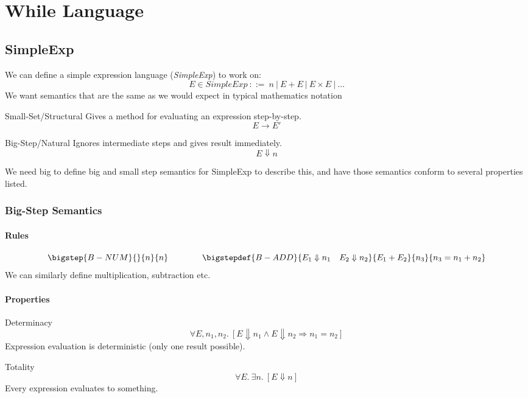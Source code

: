 \chapter{While Language}

\section{SimpleExp}
We can define a simple expression language (\textit{SimpleExp}) to work on:
\[E \in SimpleExp \ ::= \ n \ | \ E + E \ | \ E \times E \ | \ \dots\]
We want semantics that are the same as we would expect in typical mathematics notation
\begin{tcbraster}[raster columns=2,raster equal height]
    \begin{definitionbox}{Small-Set/Structural}
        Gives a method for evaluating an expression step-by-step.
        \[E \to E'\]
    \end{definitionbox}
    \begin{definitionbox}{Big-Step/Natural}
        Ignores intermediate steps and gives result immediately.
        \[E \Downarrow n\]
    \end{definitionbox}
\end{tcbraster}
\noindent We need big to define big and small step semantics for SimpleExp to describe this, and have those semantics conform to several properties listed.

\subsection{Big-Step Semantics}
\subsubsection{Rules}
\[\bigstep{B-NUM}{}{n}{n} \qquad \qquad \bigstepdef{B-ADD}{E_1 \Downarrow n_1 \quad E_2 \Downarrow n_2}{E_1 + E_2}{n_3}{n_3 = n_1 + n_2}\]
We can similarly define multiplication, subtraction etc.
\subsubsection{Properties}
\begin{tcbraster}[raster columns=2,raster equal height]
    \begin{definitionbox}{Determinacy}
        \[\forall E, n_1, n_2 . \ [E \Downarrow n_1 \land E \Downarrow n_2 \Rightarrow n_1 = n_2]\]
    Expression evaluation is deterministic (only one result possible).
    \end{definitionbox}
    \begin{definitionbox}{Totality}
        \[\forall E. \ \exists n . \ [E \Downarrow n] \]
        Every expression evaluates to something.    
    \end{definitionbox}
\end{tcbraster}

